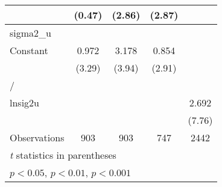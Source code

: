 {\begin{longtable}{l*{4}{c}}
                &   (0.47)         &   (2.86)         &   (2.87)         &                  \\
\hline
sigma2\_u        &                  &                  &                  &                  \\
Constant        &    0.972\sym{***}&    3.178\sym{***}&    0.854\sym{**} &                  \\
                &   (3.29)         &   (3.94)         &   (2.91)         &                  \\
\hline
/               &                  &                  &                  &                  \\
lnsig2u         &                  &                  &                  &    2.692\sym{***}\\
                &                  &                  &                  &   (7.76)         \\
\hline
Observations    &      903         &      903         &      747         &     2442         \\
\hline\hline
\multicolumn{5}{l}{\footnotesize \textit{t} statistics in parentheses}\\
\multicolumn{5}{l}{\footnotesize \sym{*} \(p<0.05\), \sym{**} \(p<0.01\), \sym{***} \(p<0.001\)}\\
\end{longtable}
}
